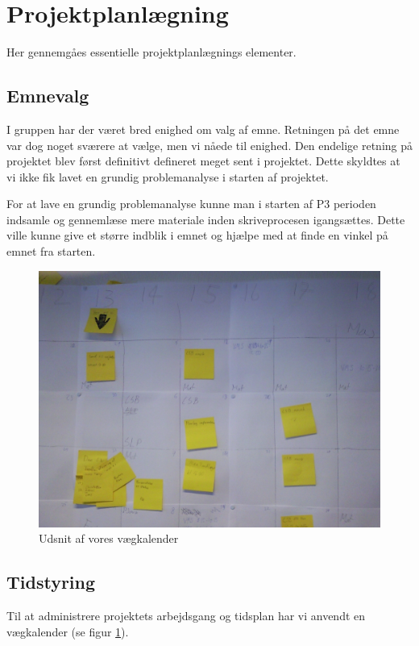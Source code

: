 \section{Projektplanl\ae{}gning}
Her gennemg\aa{}es essentielle projektplanl\ae{}gnings elementer. 

\subsection{Emnevalg}
I gruppen har der v\ae{}ret bred enighed om valg af emne. Retningen p\aa{} det emne var dog noget sv\ae{}rere at v\ae{}lge, men vi n\aa{}ede til enighed. 
Den endelige retning p\aa{} projektet blev f\o{}rst definitivt defineret meget sent i projektet.
Dette skyldtes at vi ikke fik lavet en grundig problemanalyse i starten af projektet.

For at lave en grundig problemanalyse kunne man i starten af P3 perioden indsamle og genneml\ae{}se mere materiale inden skriveprocesen igangs\ae{}ttes.
Dette ville kunne give et st\o{}rre indblik i emnet og hj\ae{}lpe med at finde en vinkel p\aa{} emnet fra starten.

\begin{figure}[htbp]
\begin{center}
\includegraphics[width=\textwidth]{Billede0075.jpg}
\caption{Udsnit af vores v\ae{}gkalender}
\label{fig:vaeg}
\end{center}
\end{figure}


\subsection{Tidstyring}
Til at administrere projektets arbejdsgang og tidsplan har vi anvendt en v\ae{}gkalender (se figur \ref{fig:vaeg}). 


